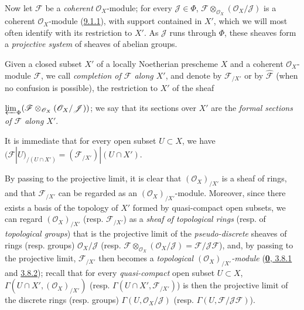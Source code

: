 \begin{env}[10.8.3]
\label{I.10.8.3}
Now let $\mathscr{F}$ be a \emph{coherent} $\mathscr{O}_X$-module; for
every $\mathscr{J}\in\Phi$,
$\mathscr{F}\otimes_{\mathscr{O}_X}(\mathscr{O}_X/\mathscr{J})$ is a
coherent $\mathscr{O}_X$-module
(\hyperref[I.9.1.1]{9.1.1}), with support contained in $X'$, which we
will most often identify with its restriction to $X'$. As
$\mathscr{J}$ runs through $\Phi$, these sheaves form a
\emph{projective system} of sheaves of abelian groups.
\end{env}

\begin{definition}[10.8.4]
\label{I.10.8.4}
Given a closed subset $X'$ of a locally Noetherian prescheme
$X$ and a coherent $\mathscr{O}_X$-module $\mathscr{F}$, we call
\emph{completion of $\mathscr{F}$ along $X'$}, and denote by
$\mathscr{F}_{/X'}$ or by $\widehat{\mathscr{F}}$ (when no confusion
is possible), the restriction to $X'$ of the sheaf


$\varprojlim_{\Phi}
(\mathscr{F}\otimes_{\mathscr{O}_X}
(\mathscr{O}_X/\mathscr{J}))$; we say that its sections over $X'$ are
the \emph{formal sections of $\mathscr{F}$ along $X'$}.
\end{definition}

It is immediate that for every open subset $U\subset X$, we have
$(\mathscr{F}|U)_{/(U\cap X')}=(\mathscr{F}_{/X'})|(U\cap X')$.

By passing to the projective limit, it is clear that
$(\mathscr{O}_X)_{/X'}$ is a sheaf of rings, and that
$\mathscr{F}_{/X'}$ can be regarded as an
$(\mathscr{O}_X)_{/X'}$-module. Moreover, since there exists a basis of
the topology of $X'$ formed by quasi-compact open subsets, we can regard
$(\mathscr{O}_X)_{/X'}$ (resp. $\mathscr{F}_{/X'}$) as a
\emph{sheaf of topological rings} (resp. of
\emph{topological groups}) that is the projective limit of the
\emph{pseudo-discrete} sheaves of rings (resp. groups)
$\mathscr{O}_X/\mathscr{J}$ (resp.
$\mathscr{F}\otimes_{\mathscr{O}_X}
(\mathscr{O}_X/\mathscr{J})=\mathscr{F}/\mathscr{J}\mathscr{F}$), and, by
passing to the projective limit, $\mathscr{F}_{/X'}$ then becomes a
\emph{topological $(\mathscr{O}_X)_{/X'}$-module}
(\hyperref[0.3.8.1]{\textbf{0}, 3.8.1} and
\hyperref[0.3.8.2]{3.8.2}); recall that for every
\emph{quasi-compact} open subset $U\subset X$,
$\Gamma(U\cap X',(\mathscr{O}_X)_{/X'})$ (resp.
$\Gamma(U\cap X',\mathscr{F}_{/X'})$) is then the projective limit of
the discrete rings (resp. groups) $\Gamma(U,\mathscr{O}_X/\mathscr{J})$
(resp. $\Gamma(U,\mathscr{F}/\mathscr{J}\mathscr{F})$).

